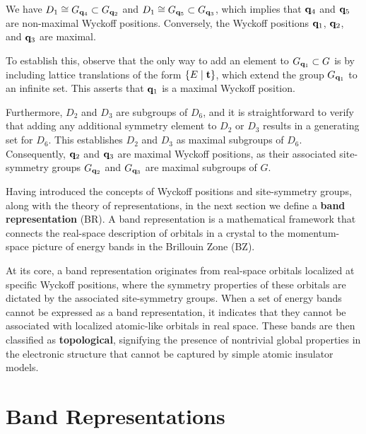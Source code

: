 \begin{example} \label{ex:maximal_wyckpos_example}
We have \( D_1 \cong G_{{\vb{q}}_4} \subset G_{{\vb{q}}_2} \) and \( D_1 \cong G_{{\vb{q}}_5} \subset G_{{\vb{q}}_3} \), which implies that \({\vb{q}}_4\) and \({\vb{q}}_5\) are non-maximal Wyckoff positions. Conversely, the Wyckoff positions \({\vb{q}}_1\), \({\vb{q}}_2\), and \({\vb{q}}_3\) are maximal.

To establish this, observe that the only way to add an element to \( G_{{\vb{q}}_1} \subset G \) is by including lattice translations of the form \(\{E \mid {\vb{t}}\}\), which extend the group \(G_{{\vb{q}}_1}\) to an infinite set. This asserts that \({\vb{q}}_1\) is a maximal Wyckoff position.

Furthermore, \( D_2 \) and \( D_3 \) are subgroups of \( D_6 \), and it is straightforward to verify that adding any additional symmetry element to \( D_2 \) or \( D_3 \) results in a generating set for \( D_6 \). This establishes \( D_2 \) and \( D_3 \) as maximal subgroups of \( D_6 \). Consequently, \({\vb{q}}_2\) and \({\vb{q}}_3\) are maximal Wyckoff positions, as their associated site-symmetry groups \( G_{{\vb{q}}_2} \) and \( G_{{\vb{q}}_3} \) are maximal subgroups of \( G \).
\end{example}

Having introduced the concepts of Wyckoff positions and site-symmetry groups, along with the theory of representations, in the next section we define a \textbf{band representation} (BR). A band representation is a mathematical framework that connects the real-space description of orbitals in a crystal to the momentum-space picture of energy bands in the Brillouin Zone (BZ).

At its core, a band representation originates from real-space orbitals localized at specific Wyckoff positions, where the symmetry properties of these orbitals are dictated by the associated site-symmetry groups. When a set of energy bands cannot be expressed as a band representation, it indicates that they cannot be associated with localized atomic-like orbitals in real space. These bands are then classified as \textbf{topological}, signifying the presence of nontrivial global properties in the electronic structure that cannot be captured by simple atomic insulator models.

\section{Band Representations}



